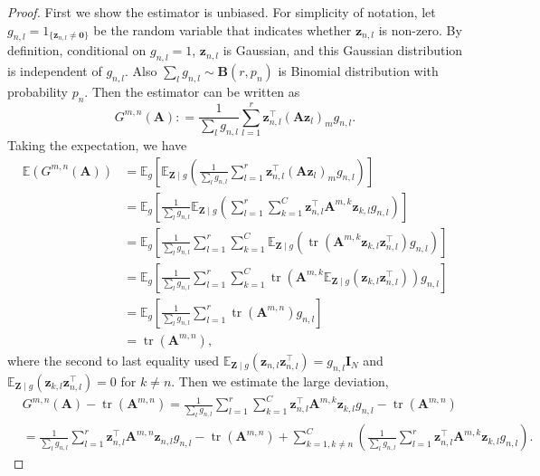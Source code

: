 \documentclass[10pt]{article}
\newcommand{\B}{\mathbf}
\begin{document}
\begin{proof} First we show the estimator is unbiased. For simplicity of notation, let $g_{n,l}=1_{\{\B{z}_{n,l} \neq \B{0}\}}$ be the random variable that indicates whether $\B{z}_{n,l}$ is non-zero. By definition, conditional on $g_{n,l}=1$, $\B{z}_{n,l}$ is Gaussian, and this Gaussian distribution is independent of $g_{n,l}$. Also $\sum_l g_{n,l}\sim \B{B}(r,p_n)$ is Binomial distribution with probability $p_n$.  Then the estimator can be written as
\[
G^{m, n}(\B{A}) : = \frac{1}{\sum_l g_{n,l}} \sum_{l=1}^r \B{z}_{n,l}^{\top} (\B{A} \B{z}_l)_m g_{n,l}.
\]
Taking the expectation, we have
\begin{align*}
\mathbb{E} (G^{m, n}(\B{A}))& = \mathbb{E}_g \left [ \mathbb{E}_{\B{Z}\mid g} \left (\frac{1}{\sum_l g_{n,l}} \sum_{l=1}^r \B{z}_{n,l}^{\top} (\B{A} \B{z}_l)_m g_{n,l} \right ) \right] \\
& = \mathbb{E}_g \left [\frac{1}{\sum_l g_{n,l}}\mathbb{E}_{\B{Z}\mid g} \left ( \sum_{l=1}^r \sum_{k=1}^C \B{z}_{n,l}^{\top} \B{A}^{m,k} \B{z}_{k,l}  g_{n,l} \right ) \right]\\
& = \mathbb{E}_g \left [\frac{1}{\sum_l g_{n,l}} \sum_{l=1}^r \sum_{k=1}^C\mathbb{E}_{\B{Z}\mid g} \left ( \operatorname{tr}( \B{A}^{m,k} \B{z}_{k,l} \B{z}_{n,l}^{\top}) g_{n,l} \right )\right]\\
& = \mathbb{E}_g \left [\frac{1}{\sum_l g_{n,l}} \sum_{l=1}^r \sum_{k=1}^C \operatorname{tr}( \B{A}^{m,k} \mathbb{E}_{\B{Z}\mid g}(\B{z}_{k,l} \B{z}_{n,l}^{\top})) g_{n,l} \right]\\
& = \mathbb{E}_g \left [\frac{1}{\sum_l g_{n,l}} \sum_{l=1}^r \operatorname{tr}(\B{A}^{m,n})g_{n,l} \right]\\
& = \operatorname{tr}(\B{A}^{m,n}),
\end{align*}
where the second to last equality used $\mathbb{E}_{\B{Z}\mid g} (\B{z}_{n,l}\B{z}_{n,l}^{\top}) = g_{n,l} \B{I}_N$ and $\mathbb{E}_{\B{Z}\mid g}( \B{z}_{k,l}\B{z}_{n,l}^{\top}) = 0$ for $k\neq n$. Then we estimate the large deviation,
\begin{align*}
& G^{m, n}(\B{A})-\operatorname{tr}(\B{A}^{m,n}) = \frac{1}{\sum_l g_{n,l}} \sum_{l=1}^r \sum_{k=1}^C \B{z}_{n,l}^{\top} \B{A}^{m,k} \B{z}_{k,l} g_{n,l}  - \operatorname{tr}(\B{A}^{m,n}) \\
& = \frac{1}{\sum_l g_{n,l}} \sum_{l=1}^r \B{z}_{n,l}^{\top} \B{A}^{m,n} \B{z}_{n,l}g_{n,l} - \operatorname{tr}(\B{A}^{m,n}) +\sum_{k=1, k\neq n}^C \left( \frac{1}{\sum_l g_{n,l}}  \sum_{l=1}^r \B{z}_{n,l}^{\top} \B{A}^{m,k} \B{z}_{k,l}g_{n,l} \right).

\end{align*}
\end{proof}
\end{document}
